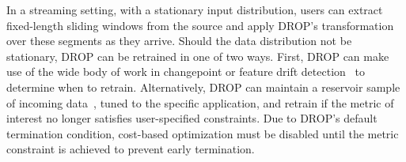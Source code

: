 



In a streaming setting, with a stationary input distribution, users can extract fixed-length sliding windows from the source and apply DROP's transformation over these segments as they arrive. 
Should the data distribution not be stationary, DROP can be retrained in one of two ways. 
First, DROP can make use of the wide body of work in changepoint or feature drift detection~\cite{cp1} to determine when to retrain. 
Alternatively, DROP can maintain a reservoir sample of incoming data~\cite{reservoir}, tuned to the specific application, and retrain if the metric of interest no longer satisfies user-specified constraints. 
Due to DROP's default termination condition, cost-based optimization must be disabled until the metric constraint is achieved to prevent early termination.




